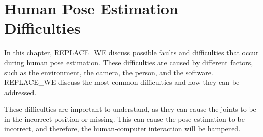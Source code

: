 \chapter{Human Pose Estimation Difficulties}
\label{sec:errors}

In this chapter, REPLACE_WE discuss possible faults and difficulties that occur during human pose estimation. These difficulties are caused by different factors, such as the environment, the camera, the person, and the software. REPLACE_WE discuss the most common difficulties and how they can be addressed. 

These difficulties are important to understand, as they can cause the joints to be in the incorrect position or missing. This can cause the pose estimation to be incorrect, and therefore, the human-computer interaction will be hampered.



